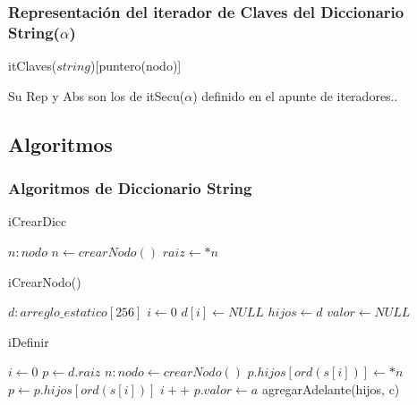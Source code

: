 

  \subsubsection{Representaci\'on del iterador de Claves del Diccionario String($\alpha$)}

    \begin{Estructura}{itClaves($string$)}[puntero(nodo)]
    \end{Estructura}

    Su Rep y Abs son los de itSecu($\alpha$) definido en el apunte de iteradores..

  \subsection{Algoritmos}
\subsubsection{Algoritmos de Diccionario String}

\begin{algorithm}
\caption{iCrearDicc}
\label{() -> res = diccString}
\begin{algorithmic}
\State $n : nodo$
\State $n \gets crearNodo()$
\State $raiz \gets *n$
\end{algorithmic}
\end{algorithm}


\begin{algorithm}
\caption{iCrearNodo()}
\label{() -> res = nodo}
\begin{algorithmic}
\State $d : arreglo\_estatico[256]$
\State $i \gets 0$
\State $d[i] \gets NULL$
\EndWhile
\State $hijos \gets d$
\State $valor \gets NULL$
\end{algorithmic}
\end{algorithm}

\begin{algorithm}
\caption{iDefinir}
\label{inout diccString(alfa): d, in string: c, in alfa: s}
\begin{algorithmic}
\State $i \gets 0$
\State $p \gets d.raiz$
\State $n: nodo \gets crearNodo()$
\State $p.hijos[ord(s[i])] \gets *n$
\EndIf
\State $p \gets p.hijos[ord(s[i])]$
\State $i++$
\EndWhile
\State $p.valor \gets a$
\State agregarAdelante(hijos, c)
\end{algorithmic}
\end{algorithm}

